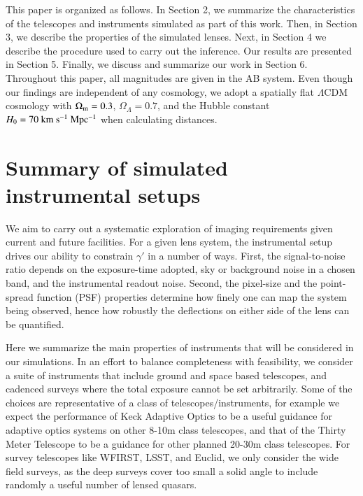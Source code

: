 \documentclass[a4paper,11pt]{article}
\begin{document}
This paper is organized as follows. In Section 2, we summarize the
characteristics of the telescopes and instruments simulated as part of
this work. Then, in Section 3, we describe the properties of the
simulated lenses. Next, in Section 4 we describe the procedure used to
carry out the inference.  Our results are presented in Section
5. Finally, we discuss and summarize our work in Section 6. Throughout
this paper, all magnitudes are given in the AB system. Even though our
findings are independent of any cosmology, we adopt a spatially flat
$\Lambda$CDM cosmology with $\Omega_{\rm{m}} = 0.3$, $\Omega_{\Lambda}
= 0.7$, and the Hubble constant $H_{0} = 70~\rm km~s^{-1}~Mpc^{-1}$
when calculating distances.



\section{Summary of simulated instrumental setups}

We aim to carry out a systematic exploration of imaging requirements
given current and future facilities. For a given lens system, the
instrumental setup drives our ability to constrain $\gamma'$ in a
number of ways. First, the signal-to-noise ratio depends on the
exposure-time adopted, sky or background noise in a chosen band, and
the instrumental readout noise. Second, the pixel-size and the
point-spread function (PSF) properties determine how finely one can
map the system being observed, hence how robustly the deflections on
either side of the lens can be quantified.

Here we summarize the main properties of instruments that will be
considered in our simulations. In an effort to balance completeness
with feasibility, we consider a suite of instruments that include
ground and space based telescopes, and cadenced surveys where the
total exposure cannot be set arbitrarily. Some of the choices are
representative of a class of telescopes/instruments, for example we
expect the performance of Keck Adaptive Optics to be a useful guidance
for adaptive optics systems on other 8-10m class telescopes, and that
of the Thirty Meter Telescope to be a guidance for other planned
20-30m class telescopes. For survey telescopes like WFIRST, LSST, and
Euclid, we only consider the wide field surveys, as the deep surveys
cover too small a solid angle to include randomly a useful number of
lensed quasars.
\end{document}
